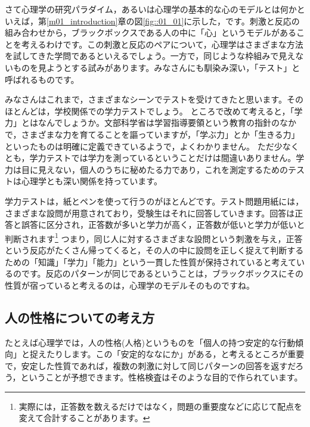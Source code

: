 \documentclass{ltjbook}
\begin{document}
さて心理学の研究パラダイム，あるいは心理学の基本的な心のモデルとは何かといえば，第\ref{m01_introduction}章の図\ref{fig::01_01}に示した，です。刺激と反応の組み合わせから，ブラックボックスである人の中に「心」というモデルがあることを考えるわけです。この刺激と反応のペアについて，心理学はさまざまな方法を試してきた学問であるといえるでしょう。一方で，同じような枠組みで見えないものを見ようとする試みがあります。みなさんにも馴染み深い，「テスト」と呼ばれるものです。

みなさんはこれまで，さまざまなシーンでテストを受けてきたと思います。そのほとんどは，学校関係での学力テストでしょう。
ところで改めて考えると，「学力」とはなんでしょうか。文部科学省は学習指導要領という教育の指針のなかで，さまざまな力を育てることを謳っていますが，「学ぶ力」とか「生きる力」といったものは明確に定義できているようで，よくわかりません。
ただ少なくとも，学力テストでは学力を測っているということだけは間違いありません。学力は目に見えない，個人のうちに秘めたる力であり，これを測定するためのテストは心理学とも深い関係を持っています。

学力テストは，紙とペンを使って行うのがほとんどです。テスト問題用紙には，さまざまな設問が用意されており，受験生はそれに回答していきます。回答は正答と誤答に区分され，正答数が多いと学力が高く，正答数が低いと学力が低いと判断されます\footnote{実際には，正答数を数えるだけではなく，問題の重要度などに応じて配点を変えて合計することがあります。}
つまり，同じ人に対するさまざまな設問という刺激を与え，正答という反応がたくさん帰ってくると，その人の中に設問を正しく捉えて判断するための「知識」「学力」「能力」という一貫した性質が保持されていると考えているのです。反応のパターンが同じであるということは，ブラックボックスにその性質が宿っていると考えるのは，心理学のモデルそのものですね。

\subsection{人の性格についての考え方}
たとえば心理学では，人の性格(人格)というものを「個人の持つ安定的な行動傾向」と捉えたりします。この「安定的ななにか」がある，と考えるところが重要で，安定した性質であれば，複数の刺激に対して同じパターンの回答を返すだろう，ということが予想できます。性格検査はそのような目的で作られています。
\end{document}
